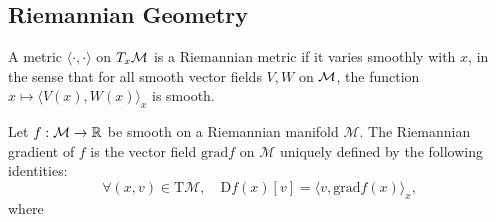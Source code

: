 \subsection{Riemannian Geometry}
\begin{definition}
    A metric $\langle \cdot, \cdot \rangle$ on $T_x \mathcal{M}$ is a Riemannian metric if it varies smoothly with $x$, in the sense that for all smooth vector fields $V,W$ on $\mathcal{M}$, the function $x \mapsto \langle V(x), W(x) \rangle_x$ is smooth.
\end{definition}

\begin{definition}
    Let $f : \mathcal{M} \to \mathbb{R}$ be smooth on a Riemannian manifold $\mathcal{M}$. The Riemannian gradient of $f$ is the vector field $\textrm{grad}f$ on $\mathcal{M}$ uniquely defined by the following identities:
    \[
        \forall (x,v) \in \textrm{T}\mathcal{M}, \quad \textrm{D}f(x)[v] = \langle v, \textrm{grad}f(x) \rangle_x,
    \]
    where 
\end{definition}